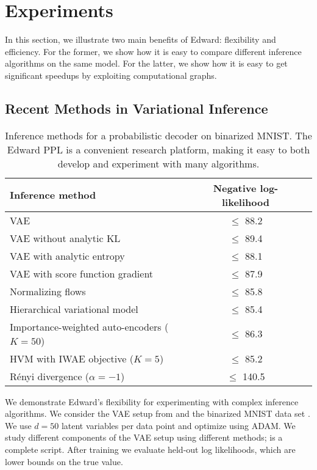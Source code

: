 \section{Experiments}
\label{sec:experiments}

In this section, we illustrate two main benefits of Edward:
flexibility and efficiency. For the former, we
show how it is easy to compare different inference algorithms on the
same model. For the latter, we show how it is easy to get significant
speedups by exploiting computational graphs.

\subsection{Recent Methods in Variational Inference}
\label{sub:recent}

\begin{table}[tb]
\centering
\begin{tabular}{lcc}
\toprule
Inference method & Negative log-likelihood
\\
\midrule
\gls{VAE} \citep{kingma2014autoencoding} & $\le$ 88.2 \\
\gls{VAE} without analytic KL & $\le$ 89.4 \\
\gls{VAE} with analytic entropy & $\le$ 88.1 \\
\gls{VAE} with score function gradient & $\le$ 87.9 \\
Normalizing flows \citep{rezende2015variational} & $\le$ 85.8 \\
Hierarchical variational model \citep{ranganath2016hierarchical} & $\le$ 85.4 \\
Importance-weighted auto-encoders ($K=50$) \citep{burda2016importance}
& $\le$ 86.3 \\
\acrshort{HVM} with \acrshort{IWAE} objective ($K=5$)
& $\le$ 85.2 \\
R\'{e}nyi divergence ($\alpha=-1$) \citep{li2016variational}
& $\le$ 140.5 \\
\bottomrule
\end{tabular}
\caption{Inference methods for a probabilistic decoder on binarized
MNIST. The Edward \gls{PPL} is a convenient research platform, making
it easy to both develop and experiment with many algorithms.}
\label{table:mnist}
\end{table}

We demonstrate Edward's flexibility for experimenting with complex
inference algorithms.
We consider the \gls{VAE} setup from  and the binarized
MNIST data set \citep{salakhutdinov2008quantitative}.  We use $d=50$
latent variables per data point and optimize using ADAM.  We study
different components of the \gls{VAE} setup using different methods;
 is a complete script.  After training we evaluate
held-out log likelihoods, which are lower bounds on the true value.

